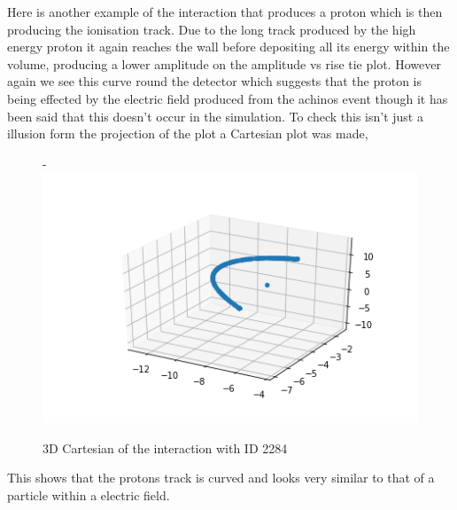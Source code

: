 \documentclass[a4paper]{article}
\begin{document}
\noindent Here is another example of the interaction that produces a proton which is then producing the ionisation track. Due to the long track produced by the high energy proton it again reaches the wall before depositing all its energy within the volume, producing a lower amplitude on the amplitude vs rise tie plot. However again we see this curve round the detector which suggests that the proton is being effected by the electric field produced from the achinos event though it has been said that this doesn't occur in the simulation. To check this isn't just a illusion form the projection of the plot a Cartesian plot was made,
\begin{figure}[H]-
        \centering
        \includegraphics[width=1\linewidth]{Fast/Cart_3D.png}
        \caption{3D Cartesian of the interaction with ID 2284}
        \label{fig:south2d}
        \end{figure}
\noindent This shows that the protons track is curved and looks very similar to that of a particle within a electric field.
\end{document}
